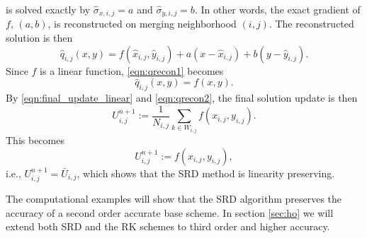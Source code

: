 is solved exactly by $\widehat{\sigma}_{x,i,j}=a$ and
$\widehat{\sigma}_{y,i,j}=b$.  In other words, the exact gradient 
of $f$, $(a,b)$, is reconstructed on merging neighborhood $(i,j)$.  
The reconstructed solution is then
\begin{equation}
    \label{eqn:qrecon1}
    \hat{q}_{i,j}(x,y) = f(\widehat{x}_{i,j},\widehat{y}_{i,j}) + a(x-\widehat{x}_{i,j})+b(y-\widehat{y}_{i,j}) .
\end{equation}
Since $f$ is a linear function, \eqref{eqn:qrecon1} becomes
\begin{equation}
    \label{eqn:qrecon2}
    \hat{q}_{i,j}(x,y) = f(x,y).
\end{equation}
By \eqref{eqn:final_update_linear} and \eqref{eqn:qrecon2}, the final solution update is then
\begin{equation} 
U^{n+1}_{i,j} := \frac{1}{N_{i,j}}\sum_{k \in W_{i,j}}f(x_{i,j},y_{i,j}).
\end{equation}
This becomes
\begin{equation} 
U^{n+1}_{i,j} := f(x_{i,j},y_{i,j}),
\end{equation}
i.e., $U^{n+1}_{i,j} = \bar{U}_{i,j}$, which shows that the SRD method is linearity preserving.

The computational examples will show that the SRD algorithm preserves 
the accuracy of a second order accurate base scheme. In section \ref{sec:ho} 
we will extend both SRD and the RK
schemes to third order and higher accuracy.




